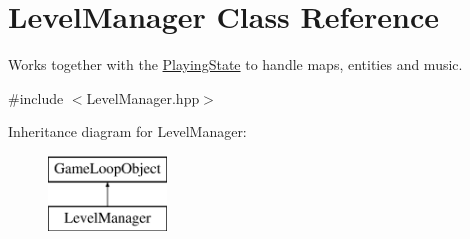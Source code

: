 \hypertarget{class_level_manager}{}\section{Level\+Manager Class Reference}
\label{class_level_manager}


Works together with the \hyperlink{class_playing_state}{Playing\+State} to handle maps, entities and music.  




{\ttfamily \#include $<$Level\+Manager.\+hpp$>$}

Inheritance diagram for Level\+Manager\+:\begin{figure}[H]
\begin{center}
\leavevmode
\includegraphics[height=2.000000cm]{class_level_manager}
\end{center}
\end{figure}
